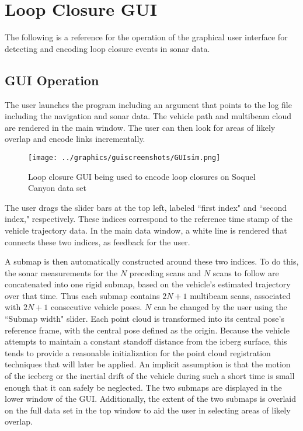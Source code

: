 
\chapter{Loop Closure GUI}
\label{ap.GUI}

The following is a reference for the operation of the graphical user interface for detecting and encoding loop closure events in sonar data.

\section{GUI Operation}

The user launches the program including an argument that points to the log file including the navigation and sonar data. The vehicle path and multibeam cloud are rendered in the main window. The user can then look for areas of likely overlap and encode links incrementally.

 \begin{figure}[htbp]
   \centering
   \texttt{[image: ../graphics/guiscreenshots/GUIsim.png]} %
   \caption{Loop closure GUI being used to encode loop closures on Soquel Canyon data set }
   \label{fig:GUI}
\end{figure}

The user drags the slider bars at the top left, labeled ``first index" and ``second index," respectively. These indices correspond to the reference time stamp of the vehicle trajectory data. In the main data window, a white line is rendered that connects these two indices, as feedback for the user. 

A submap is then automatically constructed around these two indices. To do this, the sonar measurements for the $N$ preceding scans and $N$ scans to follow are concatenated into one rigid submap, based on the vehicle's estimated trajectory over that time. Thus each submap contains $2N+1$ multibeam scans, associated with $2N+1$ consecutive vehicle poses. $N$ can be changed by the user using the ``Submap width" slider. Each point cloud is transformed into its central pose's reference frame, with the central pose defined as the origin. Because the vehicle attempts to maintain a constant standoff distance from the icberg surface, this tends to provide a reasonable initialization for the point cloud registration techniques that will later be applied. An implicit assumption is that the motion of the iceberg or the inertial drift of the vehicle during such a short time is small enough that it can safely be neglected. The two submaps are displayed in the lower window of the GUI. Additionally, the extent of the two submaps is overlaid on the full data set in the top window to aid the user in selecting areas of likely overlap.

